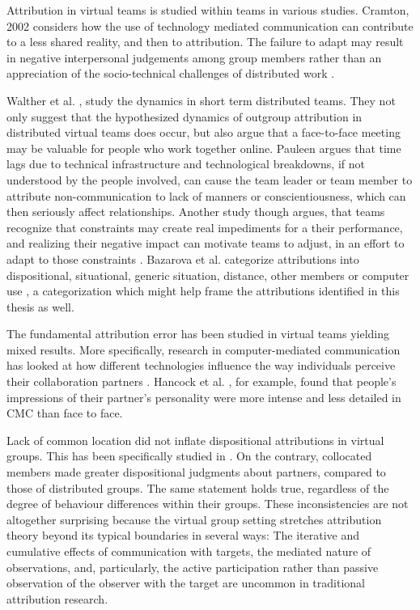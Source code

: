 Attribution in virtual teams is studied within teams in various studies.  Cramton,  2002 \cite{Cramton2002} considers how the use of technology mediated communication can contribute to a less shared reality, and then to attribution.  The failure to adapt may result in negative interpersonal judgements among group members rather than an appreciation of the socio-technical challenges of distributed work \cite{Cramton2001} .

Walther et al.  \cite{Walther2002}, study the dynamics in short term distributed teams. They not only suggest that the hypothesized dynamics of outgroup attribution in distributed virtual teams does occur, but also argue that a face-to-face meeting may be valuable for people who work together online.  Pauleen \cite{Pauleen2005} argues that time lags due to technical infrastructure and technological breakdowns, if not understood by the people involved, can cause the team leader or team member to attribute non-communication to lack of manners or conscientiousness, which can then seriously affect relationships.  Another study though argues, that teams recognize that constraints may create real impediments for a their performance, and realizing their negative impact can motivate teams to adjust, in an effort to adapt to those constraints \cite{Bazarova2012}. Bazarova et al.  categorize attributions into dispositional, situational, generic situation, distance, other members or computer use \cite{Bazarova2009}, a categorization which might help frame the attributions identified in this thesis as well.

The fundamental attribution error has been studied in virtual teams yielding mixed results.  More specifically, research in computer-mediated communication has looked at how different technologies influence the way individuals perceive their collaboration partners \cite{Straus1994}. Hancock et al. \cite{Hancock2001}, for example, found that people’s impressions of their partner's personality were more intense and less detailed in CMC than face to face. 

Lack of common location did not inflate dispositional attributions in virtual groups.  This has been specifically studied in \cite{Bazarova2009}. On the contrary, collocated members made greater dispositional judgments about partners, compared to
those of distributed groups.  The same statement holds true,  regardless of the degree of behaviour differences within their groups. These inconsistencies are not altogether surprising because the virtual group setting stretches attribution theory beyond its typical boundaries in several ways: The iterative and cumulative effects of communication with targets, the mediated nature of observations, and, particularly, the active participation rather than passive observation of the observer with the target are uncommon in traditional attribution research.

